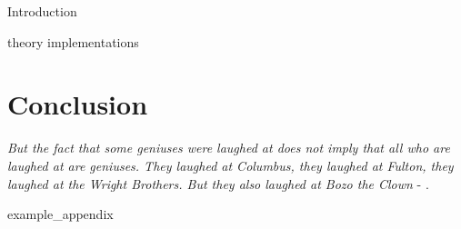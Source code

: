 \documentclass{article}
\begin{document}




\mainmatter

{Introduction}

{theory}
{implementations}

\section{Conclusion}
\textit{But the fact that some geniuses were laughed at does not imply that all who are laughed at are geniuses. They laughed at Columbus, they laughed at Fulton, they laughed at the Wright Brothers. But they also laughed at Bozo the Clown} -  \textcite{sagan_1993}.

\newpage
\printbibliography[heading = bibintoc, title = Bibliography]    %

\addappendix
{example_appendix}

\end{document}
